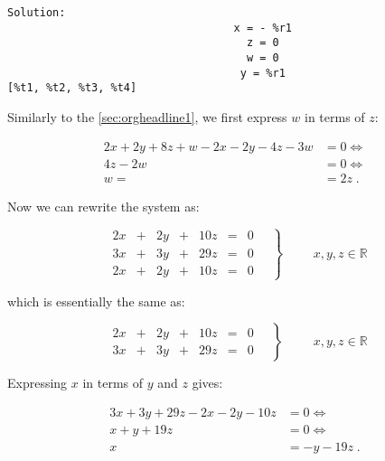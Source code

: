 \documentclass[11pt]{article}
\begin{document}
\begin{verbatim}
Solution:
                                   x = - %r1
                                     z = 0
                                     w = 0
                                    y = %r1
[%t1, %t2, %t3, %t4] 
\end{verbatim}

Similarly to the \ref{sec:orgheadline1}, we first express \(w\) in terms of \(z\):

\begin{align*}
2x + 2y + 8z + w - 2x - 2y - 4z - 3w &= 0 \iff \\
4z - 2w &= 0 \iff \\
w = &= 2z\;.
\end{align*}

Now we can rewrite the system as:

\begin{equation*}
  \left.
    \begin{alignedat}{4}
      & 2x & {}+{} & 2y & {}+{} & 10z & {}={} & 0 \\
      & 3x & {}+{} & 3y & {}+{} & 29z & {}={} & 0 \\
      & 2x & {}+{} & 2y & {}+{} & 10z & {}={} & 0
    \end{alignedat}
    \quad \right\} \qquad
  \begin{aligned}
    x,y,z \in \mathbb{R}
  \end{aligned}
\end{equation*}

which is essentially the same as:

\begin{equation*}
  \left.
    \begin{alignedat}{4}
      & 2x & {}+{} & 2y & {}+{} & 10z & {}={} & 0 \\
      & 3x & {}+{} & 3y & {}+{} & 29z & {}={} & 0 
    \end{alignedat}
    \quad \right\} \qquad
  \begin{aligned}
    x,y,z \in \mathbb{R}
  \end{aligned}
\end{equation*}

Expressing \(x\) in terms of \(y\) and \(z\) gives:

\begin{align*}
  3x + 3y + 29z - 2x - 2y - 10z &= 0 \iff \\
  x + y + 19z &= 0 \iff \\
  x &= -y - 19z\;.
\end{align*}
\end{document}
